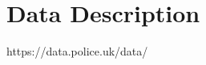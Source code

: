 \documentclass[main.tex]{subfiles}
\begin{document}
\section{Data Description}

https://data.police.uk/data/
\end{document}
